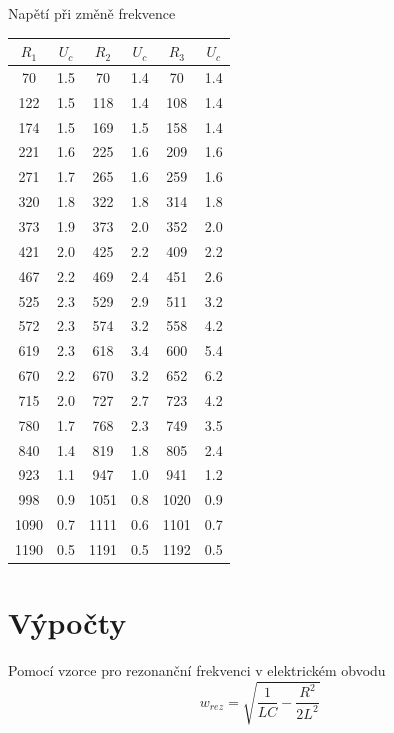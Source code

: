 \documentclass[10pt]{article}
\begin{document}
\begin{minipage}[t]{0.45\textwidth}
\begin{flushright}

Napětí při změně frekvence \\[.2cm]

\begin{tabular}{|c|c|c|c|c|c|} \hline
$R_1$ & $U_c$ & $R_2$ & $U_c$ & $R_3$ & $U_c$ \\
\hline
70 & 1.5 & 70 & 1.4 & 70 & 1.4 \\
122 & 1.5 & 118 & 1.4 & 108 & 1.4 \\
174 & 1.5 & 169 & 1.5 & 158 & 1.4 \\
221 & 1.6 & 225 & 1.6 & 209 & 1.6 \\
271 & 1.7 & 265 & 1.6 & 259 & 1.6 \\
320 & 1.8 & 322 & 1.8 & 314 & 1.8 \\
373 & 1.9 & 373 & 2.0 & 352 & 2.0 \\
421 & 2.0 & 425 & 2.2 & 409 & 2.2 \\
467 & 2.2 & 469 & 2.4 & 451 & 2.6 \\
525 & 2.3 & 529 & 2.9 & 511 & 3.2 \\
572 & 2.3 & 574 & 3.2 & 558 & 4.2 \\
619 & 2.3 & 618 & 3.4 & 600 & 5.4 \\
670 & 2.2 & 670 & 3.2 & 652 & 6.2 \\
715 & 2.0 & 727 & 2.7 & 723 & 4.2 \\
780 & 1.7 & 768 & 2.3 & 749 & 3.5 \\
840 & 1.4 & 819 & 1.8 & 805 & 2.4 \\
923 & 1.1 & 947 & 1.0 & 941 & 1.2 \\
998 & 0.9 & 1051 & 0.8 & 1020 & 0.9 \\
1090 & 0.7 & 1111 & 0.6 & 1101 & 0.7 \\
1190 & 0.5 & 1191 & 0.5 & 1192 & 0.5 \\
\hline
\end{tabular}

\end{flushright}
\end{minipage}



\section{Výpočty}
Pomocí vzorce pro rezonanční frekvenci v elektrickém obvodu
\begin{equation}
w_{rez} = \sqrt{\frac{1}{LC} - \frac{R^2}{2L^2}}
\end{equation}
\end{document}
